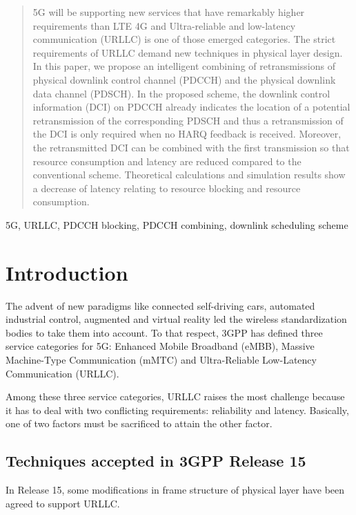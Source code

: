 \documentclass[conference,10pt]{IEEEtran}
\begin{document}
\begin{abstract}
5G will be supporting new services that have remarkably higher requirements than LTE 4G and Ultra-reliable and low-latency communication (URLLC) is one of those emerged categories. The strict requirements of URLLC demand new techniques in physical layer design. In this paper, we propose an intelligent combining of retransmissions of physical downlink control channel (PDCCH) and the physical downlink data channel (PDSCH). In the proposed scheme, the downlink control information (DCI) on PDCCH already indicates the location of a potential retransmission of the corresponding PDSCH and thus a retransmission of the DCI is only required when no HARQ feedback is received. Moreover, the retransmitted DCI can be combined with the first transmission so that resource consumption and latency are reduced compared to the conventional scheme. Theoretical calculations and simulation results show a decrease of latency relating to resource blocking and resource consumption.
\end{abstract}

\begin{IEEEkeywords}
5G, URLLC, PDCCH blocking, PDCCH combining, downlink scheduling scheme 
\end{IEEEkeywords}

\section{Introduction}
The advent of new paradigms like connected self-driving cars, automated industrial control, augmented and virtual reality led the wireless standardization bodies to take them into account. To that respect, 3GPP has defined three service categories for 5G: Enhanced Mobile Broadband (eMBB), Massive Machine-Type Communication (mMTC) and Ultra-Reliable Low-Latency Communication (URLLC). 

Among these three service categories, URLLC raises the most challenge because it has to deal with two conflicting requirements: reliability and latency. Basically, one of two factors must be sacrificed to attain the other factor. 

\subsection{Techniques accepted in 3GPP Release 15}\label{IAA}
In Release 15, some modifications in frame structure of physical layer have been agreed to support URLLC. 
\end{document}

